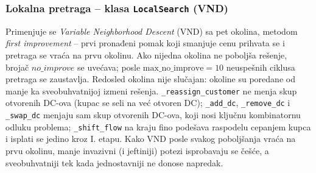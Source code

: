 \documentclass[12pt,a4paper]{article}
\begin{document}
\subsubsection{Lokalna pretraga -- klasa \texttt{LocalSearch} (VND)}

Primenjuje se \textit{Variable Neighborhood Descent} (VND) sa pet okolina,
metodom \textit{first improvement} -- prvi pronađeni pomak koji smanjuje cenu
prihvata se i pretraga se vraća na prvu okolinu. Ako nijedna okolina ne
poboljša rešenje, brojač $no\_improve$ se uvećava; posle
$\text{max\_no\_improve} = 10$ neuspešnih ciklusa pretraga se zaustavlja.
Redosled okolina nije slučajan: okoline su poredane od manje ka sveobuhvatnijoj
izmeni rešenja. \texttt{\_reassign\_customer} ne menja skup otvorenih DC-ova
(kupac se seli na već otvoren DC); \texttt{\_add\_dc}, \texttt{\_remove\_dc} i
\texttt{\_swap\_dc} menjaju sam skup otvorenih DC-ova, koji nosi ključnu
kombinatornu odluku problema; \texttt{\_shift\_flow} na kraju fino podešava
raspodelu cepanjem kupca i isplati se jedino kroz I. etapu. Kako VND posle
svakog poboljšanja vraća na prvu okolinu, manje invazivni (i jeftiniji) potezi
isprobavaju se češće, a sveobuhvatniji tek kada jednostavniji ne donose
napredak.
\end{document}
